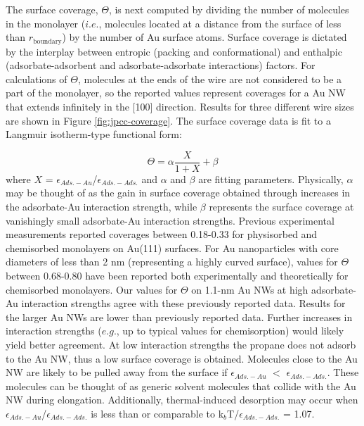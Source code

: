 \documentclass[10pt]{report}  %
\begin{document}
The surface coverage, $\Theta$, is next computed by dividing the number of molecules in the monolayer ($i.e.$, molecules located at a distance from the surface of less than $r_\mathrm{boundary}$) by the number of Au surface atoms.  Surface coverage is dictated by the interplay between entropic (packing and conformational) and enthalpic (adsorbate-adsorbent and adsorbate-adsorbate interactions) factors. \cite{Jayaraman:2008,Jayaraman_Langmuir:2008}  For calculations of $\Theta$, molecules at the ends of the wire are not considered to be a part of the monolayer, so the reported values represent coverages for a Au NW that extends infinitely in the [100] direction.  Results for three different wire sizes are shown in Figure \ref{fig:jpcc-coverage}.  The surface coverage data is fit to a Langmuir isotherm-type functional form: 

\begin{equation} \Theta = \alpha \frac{X}{1+X} + \beta \label{langmuir}\end{equation} where $X$ = $\epsilon_{Ads.-Au}$/$\epsilon_{Ads.-Ads.}$ and $\alpha$ and $\beta$ are fitting parameters.  Physically, $\alpha$ may be thought of as the gain in surface coverage obtained through increases in the adsorbate-Au interaction strength, while $\beta$ represents the surface coverage at vanishingly small adsorbate-Au interaction strengths.  Previous experimental measurements reported coverages between 0.18-0.33 for physisorbed and chemisorbed monolayers on Au(111) surfaces.\cite{Dubois:1992,Cafe:2007}  For Au nanoparticles with core diameters of less than 2 nm (representing a highly curved surface), values for $\Theta$ between 0.68-0.80 have been reported both experimentally \cite{Hostetler:1998} and theoretically \cite{Jimenez:2010} for chemisorbed monolayers.  Our values for $\Theta$ on 1.1-nm Au NWs at high adsorbate-Au interaction strengths agree with these previously reported data.  Results for the larger Au NWs are lower than previously reported data.  Further increases in interaction strengths ($e.g.$, up to typical values for chemisorption) would likely yield better agreement.  At low interaction strengths the propane does not adsorb to the Au NW, thus a low surface coverage is obtained.  Molecules close to the Au NW are likely to be pulled away from the surface if $\epsilon_{Ads.-Au}$ $<$ $\epsilon_{Ads.-Ads.}$.  These molecules can be thought of as generic solvent molecules that collide with the Au NW during elongation.  Additionally, thermal-induced desorption may occur when $\epsilon_{Ads.-Au}$/$\epsilon_{Ads.-Ads.}$ is less than or comparable to k$_b$T/$\epsilon_{Ads.-Ads.}$ = 1.07.
\end{document}
